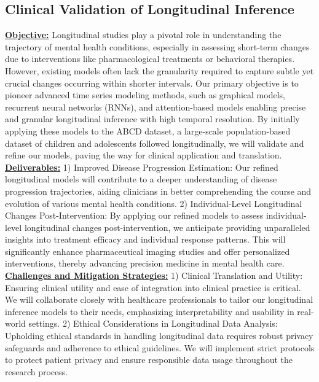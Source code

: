 \subsection{Clinical Validation of Longitudinal Inference}\label{ssec:longitudinal_inference}
\textbf{\underline{Objective:}} Longitudinal studies play a pivotal role in understanding the trajectory of mental health conditions, especially in assessing short-term changes due to interventions like pharmacological treatments or behavioral therapies. However, existing models often lack the granularity required to capture subtle yet crucial changes occurring within shorter intervals. Our primary objective is to pioneer advanced time series modeling methods, such as graphical models, recurrent neural networks (RNNs), and attention-based models enabling precise and granular longitudinal inference with high temporal resolution. By initially applying these models to the ABCD\cite{casey2018adolescent} dataset, a large-scale population-based dataset of children and adolescents followed longitudinally, we will validate and refine our models, paving the way for clinical application and translation.
\noindent\\
\textbf{\underline{Deliverables:}}
1) Improved Disease Progression Estimation: Our refined longitudinal models will contribute to a deeper understanding of disease progression trajectories, aiding clinicians in better comprehending the course and evolution of various mental health conditions.
2) Individual-Level Longitudinal Changes Post-Intervention: By applying our refined models to assess individual-level longitudinal changes post-intervention, we anticipate providing unparalleled insights into treatment efficacy and individual response patterns. This will significantly enhance pharmaceutical imaging studies and offer personalized interventions, thereby advancing precision medicine in mental health care.
\noindent\\
\textbf{\underline{Challenges and Mitigation Strategies:}}
1) Clinical Translation and Utility: Ensuring clinical utility and ease of integration into clinical practice is critical. We will collaborate closely with healthcare professionals to tailor our longitudinal inference models to their needs, emphasizing interpretability and usability in real-world settings.
2) Ethical Considerations in Longitudinal Data Analysis: Upholding ethical standards in handling longitudinal data requires robust privacy safeguards and adherence to ethical guidelines. We will implement strict protocols to protect patient privacy and ensure responsible data usage throughout the research process.